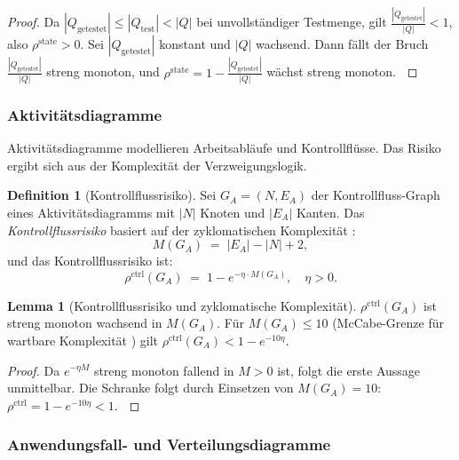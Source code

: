 ﻿\documentclass[a4paper,12pt]{article}
\theoremstyle{definition}
\newtheorem{definition}{Definition}
\newtheorem{lemma}{Lemma}
\newenvironment{beweis}{\begin{proof}}{\end{proof}}
\begin{document}
\begin{beweis}
    Da $|Q_{\mathrm{getestet}}| \leq |Q_{\mathrm{test}}| < |Q|$ bei unvollst\"andiger
    Testmenge, gilt $\frac{|Q_{\mathrm{getestet}}|}{|Q|} < 1$, also
    $\rho^{\mathrm{state}} > 0$. Sei $|Q_{\mathrm{getestet}}|$ konstant und $|Q|$
    wachsend. Dann f\"allt der Bruch $\frac{|Q_{\mathrm{getestet}}|}{|Q|}$ streng
    monoton, und $\rho^{\mathrm{state}} = 1 - \frac{|Q_{\mathrm{getestet}}|}{|Q|}$
    w\"achst streng monoton. $\qedhere$
\end{beweis}

\subsubsection{Aktivit\"atsdiagramme}

Aktivit\"atsdiagramme modellieren Arbeitsabl\"aufe und Kontrollfl\"usse. Das Risiko
ergibt sich aus der Komplexit\"at der Verzweigungslogik.

\begin{definition}[Kontrollflussrisiko]
\label{def:kfrisiko}
    Sei $G_A = (N, E_A)$ der Kontrollfluss-Graph eines Aktivit\"atsdiagramms mit
    $|N|$ Knoten und $|E_A|$ Kanten. Das \emph{Kontrollflussrisiko} basiert auf der
    zyklomatischen Komplexit\"at \cite{mccabe1976}:
    \[
        M(G_A) \;=\; |E_A| - |N| + 2,
    \]
    und das Kontrollflussrisiko ist:
    \[
        \rho^{\mathrm{ctrl}}(G_A) \;=\; 1 - e^{-\eta \cdot M(G_A)}, \quad \eta > 0.
    \]
\end{definition}

\begin{lemma}[Kontrollflussrisiko und zyklomatische Komplexit\"at]
\label{lem:kf-zyklom}
    $\rho^{\mathrm{ctrl}}(G_A)$ ist streng monoton wachsend in $M(G_A)$.
    F\"ur $M(G_A) \leq 10$ (McCabe-Grenze f\"ur wartbare Komplexit\"at \cite{mccabe1976})
    gilt $\rho^{\mathrm{ctrl}}(G_A) < 1 - e^{-10\eta}$.
\end{lemma}

\begin{beweis}
    Da $e^{-\eta M}$ streng monoton fallend in $M > 0$ ist, folgt die erste Aussage
    unmittelbar. Die Schranke folgt durch Einsetzen von $M(G_A) = 10$:
    $\rho^{\mathrm{ctrl}} = 1 - e^{-10\eta} < 1$. $\qedhere$
\end{beweis}

\subsubsection{Anwendungsfall- und Verteilungsdiagramme}
\end{document}
